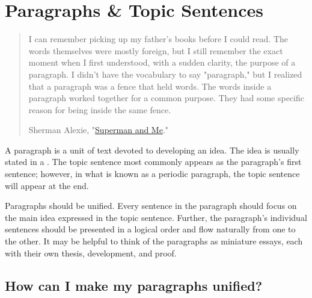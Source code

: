\hypertarget{organization}{}
\chapter{Paragraphs \& Topic Sentences}

\begin{quote}
\small
I can remember picking up my father's books before I could read. The words themselves were mostly foreign, but I still remember the exact moment when I first understood, with a sudden clarity, the purpose of a paragraph. I didn't have the vocabulary to say "paragraph," but I realized that a paragraph was a fence that held words. The words inside a paragraph worked together for a common purpose. They had some specific reason for being inside the same fence.

\textemdash Sherman Alexie, "\href{http://articles.latimes.com/1998/apr/19/books/bk-42979}{Superman and Me}."

\end{quote}

A paragraph is a unit of text devoted to developing an idea. The idea is usually stated 
in a . The topic sentence most commonly appears as the paragraph's first sentence;
however, in what is known as a periodic paragraph, the topic sentence will appear at the end.

Paragraphs should be unified. Every sentence in the paragraph should focus on the main idea expressed in the topic sentence. Further, the paragraph's individual sentences should be presented in a logical order and flow naturally from one to the other. It may be helpful to think of the paragraphs as miniature essays, each with their own thesis, development, and proof. 

\section{How can I make my paragraphs unified?}

